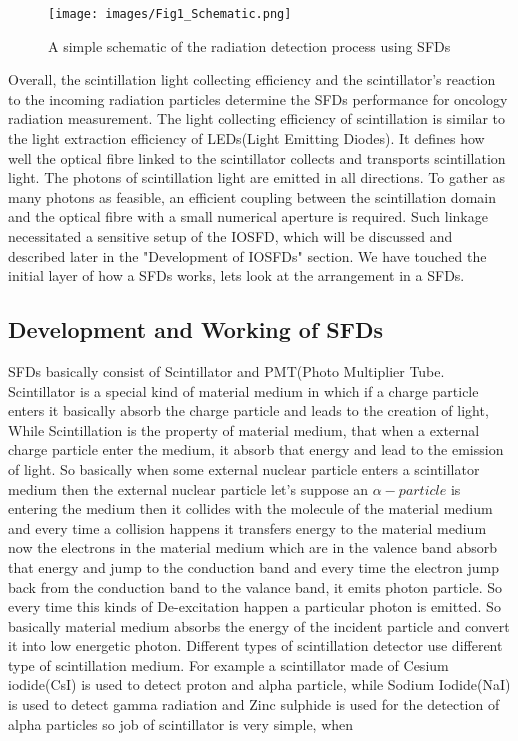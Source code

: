 \documentclass{article}
\begin{document}
\begin{multicols}{2}
\begin{figure}[H]
    \centering
    \texttt{[image: images/Fig1\_Schematic.png]}
    \caption{A simple schematic of the radiation detection process using SFDs}
    \label{fig:1}
\end{figure}

Overall, the scintillation light collecting efficiency and the scintillator's reaction to the incoming radiation particles determine the SFDs performance for oncology radiation measurement. The light collecting efficiency of scintillation is similar to the light extraction efficiency of LEDs(Light Emitting Diodes). It defines how well the optical fibre linked to the scintillator collects and transports scintillation light. The photons of scintillation light are emitted in all directions. To gather as many photons as feasible, an efficient coupling between the scintillation domain and the optical fibre with a small numerical aperture is required. Such linkage necessitated a sensitive setup of the IOSFD, which will be discussed and described later in the "Development of IOSFDs" section. We have touched the initial layer of how a SFDs works, lets look at the arrangement in a SFDs. 

\subsection{Development and Working of SFDs}
SFDs basically consist of Scintillator and PMT(Photo Multiplier Tube. Scintillator is a special kind of material medium in which if a charge particle enters it basically absorb the charge particle and leads to the creation of light, While Scintillation is the property of material medium, that when a external charge particle enter the medium, it absorb that energy and lead to the emission of light. So basically when some external nuclear particle enters a scintillator medium then the external nuclear particle let's suppose an $\alpha-particle$ is entering the medium then it collides with the molecule of the material medium and every time a collision happens it transfers energy to the material medium now the electrons in the material medium which are in the valence band absorb that energy and jump to the conduction band and every time the electron jump back from the conduction band to the valance band, it emits photon particle. So every time this kinds of De-excitation happen a particular photon is emitted. So basically material medium  absorbs the energy of the incident particle and convert it into low energetic photon. Different types of scintillation detector use different type of scintillation medium. For example  a scintillator made of Cesium iodide(CsI) is used to detect proton and alpha particle, while Sodium Iodide(NaI) is used to detect gamma radiation and Zinc sulphide is used for the detection of alpha particles so job of scintillator is very simple, when 

\end{multicols}






 
\end{document}
